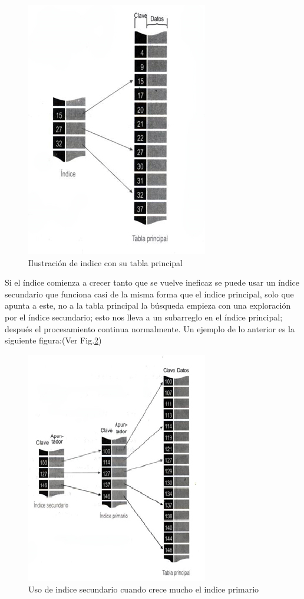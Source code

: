 \documentclass[11pt,a4paper]{article}
\begin{document}
\begin{figure}
\centering
\includegraphics[scale=0.7]{Index}
\caption{Ilustración de indice con su tabla principal}
\label{figIndex}
\end{figure}

Si el índice comienza a crecer tanto que se vuelve ineficaz se puede usar un índice secundario que funciona casi de la misma forma que el índice principal, solo que apunta a este, no a la tabla principal la búsqueda empieza con una exploración por el índice secundario; esto nos lleva a un subarreglo en el índice principal; después el procesamiento continua normalmente. Un ejemplo de lo anterior es la siguiente figura:(Ver Fig.\ref{figIndex2})

\begin{figure}
\centering
\includegraphics[scale=0.7]{Index2}
\caption{Uso de indice secundario cuando crece mucho el indice primario}
\label{figIndex2}
\end{figure}
\end{document}
